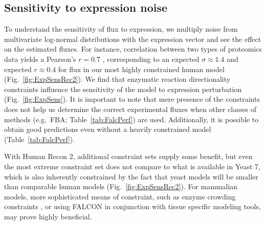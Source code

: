 \subsection{Sensitivity to expression noise}
\label{sec:sensToExpNoise}
To understand the sensitivity of flux to expression, we multiply noise
from multivariate log-normal distributions with the expression vector
and see the effect on the estimated fluxes. For instance, correlation
between two types of proteomics data yields a Pearson's $r = 0.7$
\citep{Gholami2013}, corresponding to an expected $\sigma \approx 1.4$
and expected $r \approx 0.4$ for flux in our most highly constrained
human model (\suppOrApp Fig.~\ref{fig:ExpSensRec2}). We find that
enzymatic reaction directionality constraints influence the
sensitivity of the model to expression perturbation
(Fig.~\ref{fig:ExpSens}). It is important to note that mere presence
of the constraints does not help us determine the correct experimental
fluxes when other classes of methods (e.g.\ FBA;
Table~\ref{tab:FalcPerf}) are used. Additionally, it is possible to
obtain good predictions even without a heavily constrained model
(Table~\ref{tab:FalcPerf}).

With Human Recon 2, additional constraint sets supply some benefit,
but even the most extreme constraint set does not compare to what is
available in Yeast 7, which is also inherently constrained by the fact
that yeast models will be smaller than comparable human models
(\suppOrApp Fig.~\ref{fig:ExpSensRec2}). For mammalian models, more
sophisticated means of constraint, such as enzyme crowding constraints
\citep{Shlomi2011}, or using FALCON in conjunction with tissue
specific modeling tools, may prove highly beneficial.

